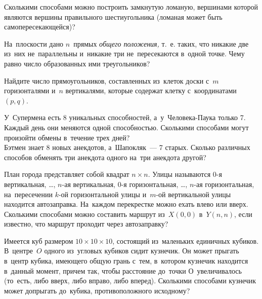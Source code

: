 


\begin{problems}

\item
Сколькими способами можно построить замкнутую ломаную, вершинами которой
являются вершины правильного шестиугольника
(ломаная может быть самопересекающейся)?

\item
На~плоскости дано $n$~прямых \emph{общего положения,} т.~е. таких, что никакие
две из~них не~параллельны и~никакие три не~пересекаются в~одной точке.
Чему равно число образованных ими треугольников?

\item
Найдите число прямоугольников, составленных из~клеток доски с~$m$ горизонталями
и~$n$ вертикалями, которые содержат клетку с~координатами $(p, q)$.

\item
\subproblem
У~Супермена есть 8 уникальных способностей, а~у~Человека-Паука только 7.
Каждый день они меняются одной способностью.
Сколькими способами могут произойти обмены в~течение трех дней?
\\
\subproblem
Бэтмен знает 8 новых анекдотов, а~Шапокляк~--- 7 старых.
Сколько различных способов обменять три анекдота одного на~три анекдота другой?

\item
План города представляет собой квадрат $n \times n$.
Улицы называются 0-я вертикальная, \ldots, $n$-ая вертикальная,
0-я горизонтальная, \ldots, $n$-ая горизонтальная,
на~пересечении $k$-ой горизонтальной улицы и~$m$-ой вертикальной улицы
находится автозаправка.
На~каждом перекрестке можно ехать влево или вверх.
Сколькими способами можно составить маршрут из~$X (0, 0)$ в~$Y (n, n)$, если
известно, что маршрут проходит через автозаправку?

\item
Имеется куб размером $10 \times 10 \times 10$, состоящий из~маленьких единичных
кубиков.
В~центре~$O$ одного из~угловых кубиков сидит кузнечик.
Он может прыгать в~центр кубика, имеющего общую грань с~тем, в~котором кузнечик
находится в~данный момент, причем так, чтобы расстояние до~точки
О~увеличивалось (то~есть, либо вверх, либо вправо, либо вперед).
Сколькими способами кузнечик может допрыгать до~кубика, противоположного
исходному?


\end{problems}
